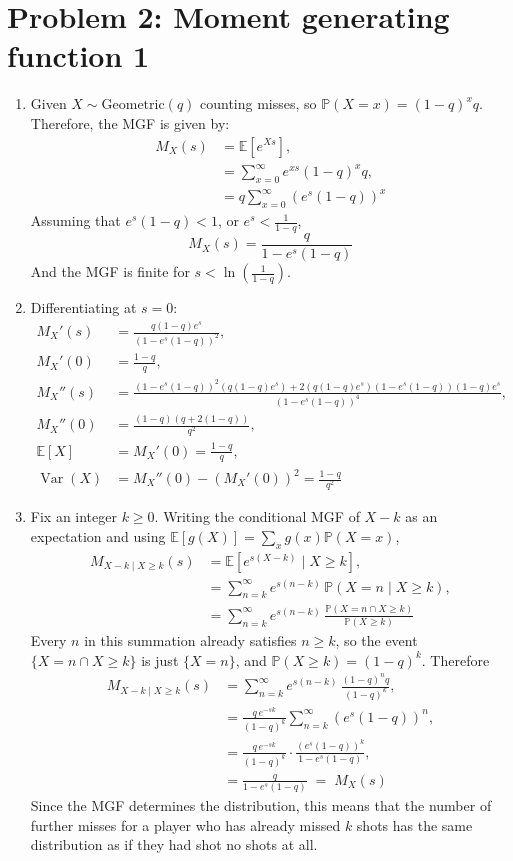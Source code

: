 \documentclass[11pt]{article}
\newcommand{\E}{\mathbb{E}}
\newcommand{\Prob}{\mathbb{P}}
\newcommand{\Var}{\operatorname{Var}}
\begin{document}
\section*{Problem 2: Moment generating function 1}

\begin{enumerate}[label=(\alph*)]
  \item Given $X \sim \text{Geometric}(q)$ counting misses, so $\Prob(X = x) = (1-q)^x q$. Therefore, the MGF is given by:
  \begin{align}
    M_X(s) &= \E[e^{Xs}], \\
    &= \sum_{x=0}^{\infty} e^{xs}(1-q)^x q, \\
    &= q \sum_{x=0}^{\infty} (e^s (1-q))^x
  \end{align}
  Assuming that $e^s(1-q) < 1$, or $e^s < \tfrac{1}{1-q}$,
  \[
    M_X(s) = \frac{q}{1-e^s(1-q)}
  \]
  And the MGF is finite for $s < \ln(\tfrac{1}{1-q})$.

  \item Differentiating at $s=0$:
  \begin{align}
    M_X'(s) &= \frac{q(1-q)e^s}{(1-e^s(1-q))^2}, \\
    M_X'(0) &= \frac{1-q}{q}, \\
    M_X''(s) &= \frac{(1-e^s(1-q))^2(q(1-q)e^s) + 2(q(1-q)e^s)(1-e^s(1-q))(1-q)e^s}{(1-e^s(1-q))^4}, \\
    M_X''(0) &= \frac{(1-q)(q+2(1-q))}{q^2}, \\
    \E[X] &= M_X'(0) = \frac{1-q}{q}, \\
    \Var(X) &= M_X''(0) - (M_X'(0))^2 = \frac{1-q}{q^2}
  \end{align}

  \item Fix an integer $k \ge 0$. Writing the conditional MGF of $X-k$ as an expectation and using
  $\E[g(X)] = \sum_x g(x)\Prob(X=x)$,
  \begin{align}
    M_{X-k \mid X \ge k}(s) &= \E\!\left[e^{s(X-k)} \mid X \ge k\right], \\
    &= \sum_{n=k}^{\infty} e^{s(n-k)}\,\Prob(X = n \mid X \ge k), \\
    &= \sum_{n=k}^{\infty} e^{s(n-k)}\,\frac{\Prob(X=n \cap X \ge k)}{\Prob(X \ge k)}
  \end{align}
  Every $n$ in this summation already satisfies $n \ge k$, so the event $\{X = n \cap X \ge k\}$
  is just $\{X = n\}$, and $\Prob(X \ge k) = (1-q)^k$. Therefore
  \begin{align}
    M_{X-k \mid X \ge k}(s) &= \sum_{n=k}^{\infty} e^{s(n-k)}\,\frac{(1-q)^n q}{(1-q)^k}, \\
    &= \frac{q\,e^{-sk}}{(1-q)^k}\sum_{n=k}^{\infty} \left(e^s(1-q)\right)^n, \\
    &= \frac{q\,e^{-sk}}{(1-q)^k}\cdot\frac{\left(e^s(1-q)\right)^k}{1-e^s(1-q)}, \\
    &= \frac{q}{1-e^s(1-q)} \;=\; M_X(s)
  \end{align}
  Since the MGF determines the distribution, this means that the number of further misses for a
  player who has already missed $k$ shots has the same distribution as if they had shot no shots at
  all. 


\end{enumerate}
\end{document}

